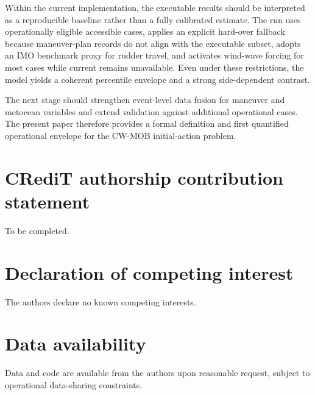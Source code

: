 \documentclass[preprint,12pt]{elsarticle}
\begin{document}
Within the current implementation, the executable results should be interpreted as a reproducible baseline rather than a fully calibrated estimate. The run uses operationally eligible accessible cases, applies an explicit hard-over fallback because maneuver-plan records do not align with the executable subset, adopts an IMO benchmark proxy for rudder travel, and activates wind-wave forcing for most cases while current remains unavailable. Even under these restrictions, the model yields a coherent percentile envelope and a strong side-dependent contrast.

The next stage should strengthen event-level data fusion for maneuver and metocean variables and extend validation against additional operational cases. The present paper therefore provides a formal definition and first quantified operational envelope for the CW-MOB initial-action problem.

\section*{CRediT authorship contribution statement}
To be completed.

\section*{Declaration of competing interest}
The authors declare no known competing interests.

\section*{Data availability}
Data and code are available from the authors upon reasonable request, subject to operational data-sharing constraints.
\end{document}
